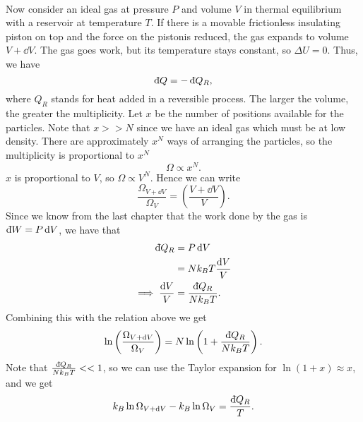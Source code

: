 \documentclass[../thermodynamics.tex]{subfiles}
\begin{document}
        \paragraph{}
        Now consider an ideal gas at pressure $P$ and volume $V$ in thermal equilibrium with a reservoir at temperature $T$.
        If there is a movable frictionless insulating piston on top and the force on the pistonis reduced, the gas expands to volume $V+\dd{V}$.
        The gas goes work, but its temperature stays constant, so $\Delta U=0$.
        Thus, we have
        \begin{equation}
            \dbar{Q}=-\dbar{Q}_R,
        \end{equation}
        where $Q_R$ stands for heat added in a reversible process.
        The larger the volume, the greater the multiplicity.
        Let $x$ be the number of positions available for the particles.
        Note that $x>>N$ since we have an ideal gas which must be at low density.
        There are approximately $x^N$ ways of arranging the particles, so the multiplicity is proportional to $x^N$
        \begin{equation}
            \Omega\propto x^N.
        \end{equation}
        $x$ is proportional to $V$, so $\Omega\propto V^N$.
        Hence we can write
        \begin{equation}
            \frac{\Omega_{V+\dd{V}}}{\Omega_V}=\left(\frac{V+\dd{V}}{V}\right).
        \end{equation}
        Since we know from the last chapter that the work done by the gas is $\dbar{W}=P\dd{V}$, we have that
        \begin{align}
            \dbar{Q}_R&=P\dd{V}\\
            &=Nk_BT\frac{\dd{V}}{V}\\
            \implies\frac{\dd{V}}{V}&=\frac{\dbar{Q}_R}{Nk_BT}.
        \end{align}
        Combining this with the relation above we get
        \begin{equation}
            \ln\left(\frac{\Omega_{V+\dd{V}}}{\Omega_V}\right)=N\ln\left(1+\frac{\dbar{Q}_R}{Nk_BT}\right).
        \end{equation}
        Note that $\frac{\dbar{Q}_R}{Nk_BT}<<1$, so we can use the Taylor expansion for $\ln(1+x)\approx x$, and we get
        \begin{equation}
            k_B\ln\Omega_{V+\dd{V}}-k_B\ln\Omega_V=\frac{\dbar{Q}_R}{T}.
        \end{equation}
\end{document}
